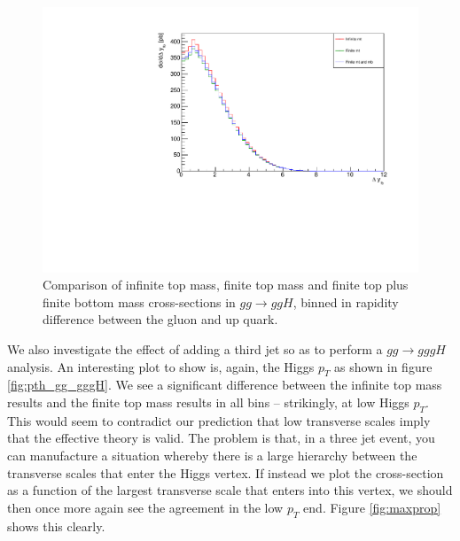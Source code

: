 \begin{figure}[H]
\centering
\includegraphics[scale=0.7]{Images/ydiff_gg.pdf}
\caption{Comparison of infinite top mass, finite top mass and finite top plus finite bottom mass cross-sections in $gg \to ggH$, binned in rapidity difference between the gluon and up quark.}
\label{fig:ydiff_gg}
\end{figure}
We also investigate the effect of adding a third jet so as to perform a $gg \to gggH$ analysis. An interesting plot to show is, again, the Higgs $p_T$ as shown in figure \ref{fig:pth_gg_gggH}. We see a significant difference between the infinite top mass results and the finite top mass results in all bins -- strikingly, at low Higgs $p_T$. This would seem to contradict our prediction that low transverse scales imply that the effective theory is valid. The problem is that, in a three jet event, you can manufacture a situation whereby there is a large hierarchy between the transverse scales that enter the Higgs vertex. If instead we plot the cross-section as a function of the largest transverse scale that enters into this vertex, we should then once more again see the agreement in the low $p_T$ end. Figure \ref{fig:maxprop} shows this clearly. %

